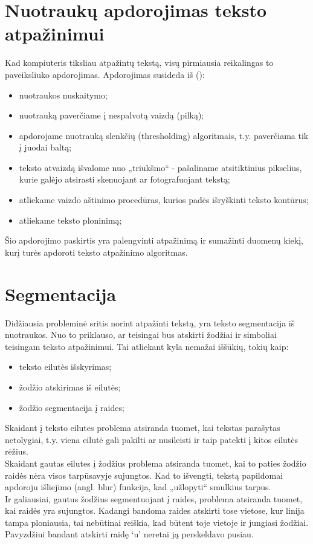 \documentclass[a4paper,12pt]{article}
\begin{document}
\section{Nuotraukų apdorojimas teksto atpažinimui}
Kad kompiuteris tiksliau atpažintų tekstą, visų pirmiausia reikalingas to paveiksliuko apdorojimas. Apdorojimas susideda iš  (\cite{KavaliauskasFelinskas, Beigi}):
\begin{itemize}
	\item nuotraukos nuskaitymo;
	\item nuotrauką paverčiame į nespalvotą vaizdą (pilką);
	\item apdorojame nuotrauką slenkčių (thresholding) algoritmais, t.y. paverčiama tik į juodai baltą;
	\item teksto atvaizdą išvalome nuo „triukšmo“ - pašaliname atsitiktinius pikselius, kurie galėjo atsirasti skenuojant ar fotografuojant tekstą;
	\item atliekame vaizdo aštinimo procedūras, kurios padės išryškinti teksto kontūrus;
	\item atliekame teksto ploninimą;
\end{itemize}
Šio apdorojimo paskirtis yra palengvinti atpažinimą ir sumažinti duomenų kiekį, kurį turės apdoroti teksto atpažinimo algoritmas.
\section{Segmentacija}
Didžiausia probleminė sritis norint atpažinti tekstą, yra teksto segmentacija iš nuotraukos. Nuo to priklauso, ar teisingai bus atskirti žodžiai ir simboliai teisingam teksto atpažinimui. Tai atliekant kyla nemažai iššūkių, tokių kaip: 
\begin{itemize}
	\item teksto eilutės išskyrimas;
	\item žodžio atskirimas iš eilutės;
	\item žodžio segmentacija į raides;
\end{itemize}
\indent Skaidant į teksto eilutes  problema atsiranda tuomet, kai tekstas parašytas netolygiai, t.y. viena eilutė gali pakilti ar nusileisti ir taip patekti į kitos eilutės rėžius. \\
\indent Skaidant gautas eilutes į žodžius problema atsiranda tuomet, kai to paties žodžio raidės nėra visos tarpūsavyje sujungtos. Kad to išvengti, tekstą papildomai apdoroju išliejimo (angl. blur) funkcija, kad „užlopyti“ smulkius tarpus.\\
\indent Ir galiausiai, gautus žodžius segmentuojant į raides, problema atsiranda tuomet, kai raidės yra sujungtos. Kadangi bandoma raides atskirti tose vietose, kur linija tampa ploniausia, tai nebūtinai reiškia, kad būtent toje vietoje ir jungiasi žodžiai. Pavyzdžiui bandant atskirti raidę `u' neretai ją perskeldavo pusiau.
\end{document}
